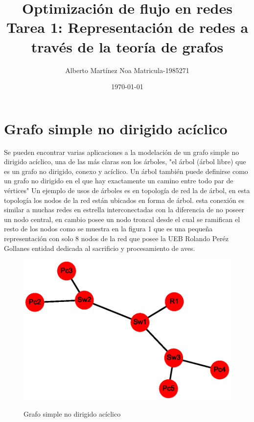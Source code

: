 \documentclass{article}
\title{Optimización de flujo en redes \linebreak   Tarea 1: Representación de redes a través de la teoría de grafos}
\author{Alberto Martínez Noa \linebreak Matricula-1985271}
\date{\today}
\begin{document}
\maketitle
\section{ Grafo simple no dirigido acíclico}
Se pueden encontrar varias aplicaciones a la modelación de un grafo simple no dirigido acíclico, una de las más claras son los árboles, "el árbol (árbol libre) que es un grafo no dirigido, conexo y acíclico. Un árbol también puede definirse como un grafo no dirigido en el que hay exactamente un camino entre todo par de vértices"\cite{gf1} \linebreak
Un ejemplo de usos de árboles es en topología de red la de árbol, en esta topología los nodos de la red están ubicados en forma de árbol. esta conexión es similar a muchas redes en estrella interconectadas con la diferencia de no poseer un nodo central, en cambio posee un nodo troncal desde el cual se ramifican el resto de los nodos como se muestra en la figura 1 que es una pequeña representación con solo 8 nodos de la red que posee la UEB Rolando Peréz Gollanes entidad dedicada al sacrificio y procesamiento de aves.
 
 
\begin{center}

\end{center}
\begin{figure}[h]
\begin{center}
\includegraphics[scale=0.7]{Graf1.eps}\\
\caption{Grafo simple no dirigido acíclico}
\end{center}
\end{figure}
\end{document}
